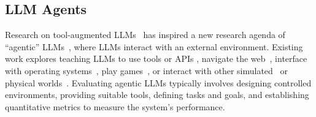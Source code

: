 \documentclass[]{fairmeta}
\newcommand{\dm}[1]{\colorbox{Emerald}{\textcolor{white}{Despoina}}\textcolor{Emerald}{\textbf{:#1}}}
\begin{document}



\subsection{LLM Agents}
Research on tool-augmented LLMs~ \citep{schick2023toolformerlanguagemodelsteach} has inspired a new research agenda of “agentic” LLMs~\citep{kaddour2023challenges, wangSurveyLargeLanguage2024}, where LLMs interact with an external environment. Existing work explores teaching LLMs to use tools or APIs \citep{schick2023toolformerlanguagemodelsteach, qin2023toolllmfacilitatinglargelanguage}, navigate the web~\citep{nakano2022webgptbrowserassistedquestionansweringhuman, deng2023mind2webgeneralistagentweb, zhou2023webarena}, interface with operating systems~\citep{wu2024copilot}, play games~\citep{paglieri2024balrog,wang2023voyager}, or interact with other simulated~\citep{wang2024userbehaviorsimulationlarge, lin2023agentsimsopensourcesandboxlarge} or physical worlds~\citep{zhang2024buildingcooperativeembodiedagents}. Evaluating agentic LLMs typically involves designing controlled environments, providing suitable tools, defining tasks and goals, and establishing quantitative metrics to measure the system’s performance.
\end{document}
